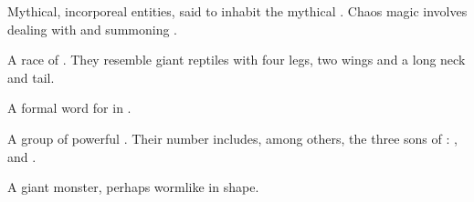 \begin{gloss}
\begin{comment}
\paragraph{\daemon}
\end{comment}
\gitem[\daemons]{\daemon}
Mythical, incorporeal entities, said to inhabit the mythical . 
Chaos magic involves dealing with and summoning \daemons. 







\begin{comment}
\paragraph{\dragon}
\end{comment}
\gitem{\dragon}
A race of . 
They resemble giant reptiles with four legs, two wings and a long neck and tail. 





\begin{subgloss}
  \begin{comment}
  \subparagraph{\draecchonosh}
  \end{comment}
  \gitem[\draecchonosh]{\draecchonosh}
  A formal word for \quo{\dragon} in . 
  
  
  
  
  \begin{comment}
  \subparagraph{\shaeeroth}
  \end{comment}
  \gitem[\shaeeroths]{\shaeeroth}
  A group of powerful \dragons. 
  Their number includes, among others, the three sons of : 
  , 
   and 
  . 
\end{subgloss}









\begin{comment}
\paragraph{\ghobal}
\end{comment}
\gitem[\ghobaleth]{\ghobal}
A giant monster, perhaps wormlike in shape. 










\end{gloss}
